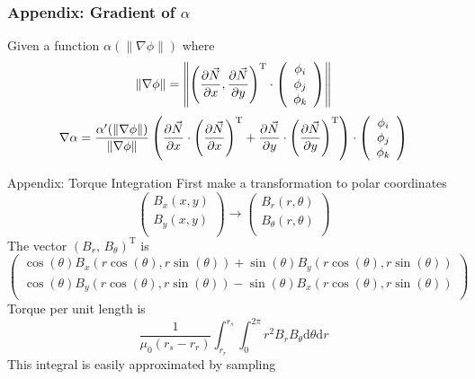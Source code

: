 \documentclass{beamer}
\newcommand\normm[1]{\left\lVert#1\right\rVert}
\begin{document}
    \begin{frame}[fragile]\frametitle{Appendix: Gradient of $\alpha$}
        Given a function $\alpha(\|\nabla\phi\|)$ where
        \[\normm{\nabla\phi}=\normm{\left(\pdv{\vec{N}}{x}, \pdv{\vec{N}}{y} \right)^{\text{T}}\cdot \left(
        \begin{array}{c}
            \phi _i \\
            \phi _j \\
            \phi _k \\
        \end{array}
        \right)}\]
        \[\nabla\alpha=\frac{\alpha'(\normm{\nabla\phi})}{\normm{\nabla\phi}}
        \left(\pdv{\vec{N}}{x}\cdot\left(\pdv{\vec{N}}{x}\right)^{\text{T}}+
        \pdv{\vec{N}}{y}\cdot\left(\pdv{\vec{N}}{y}\right)^{\text{T}}\right)\cdot \left(
        \begin{array}{c}
            \phi _i \\
            \phi _j \\
            \phi _k \\
        \end{array}
        \right)\]
    \end{frame}
    \begin{frame}{Appendix: Torque Integration}
        First make a transformation to polar coordinates
        \[\left(
        \begin{array}{c}
            B_x(x,y) \\
            B_y(x,y) \\
        \end{array}
        \right) \to \left(
        \begin{array}{c}
            B_r(r,\theta) \\
            B_{\theta}(r,\theta) \\
        \end{array}
        \right) \]
        The vector $\left( B_r,\,B_{\theta} \right)^{\text{T}}$ is
        \[\left(
        \begin{array}{c}
            \cos (\theta )B_x(r \cos (\theta ),r \sin (\theta ))+\sin (\theta )B_y(r \cos (\theta ),r \sin (\theta )) \\
            \cos (\theta )B_y(r \cos (\theta ),r \sin (\theta ))-\sin (\theta )B_x(r \cos (\theta ),r \sin (\theta )) \\
        \end{array}
        \right)\]
        Torque per unit length is
        \[
            \frac{1}{\mu_0 (r_s-r_r)}\int_{r_r}^{r_s}\int_{0}^{2\pi} r^{2}B_r B_{\theta}\mathrm{d}\theta\mathrm{d}r
        \]
        This integral is easily approximated by sampling
    \end{frame}
\end{document}
